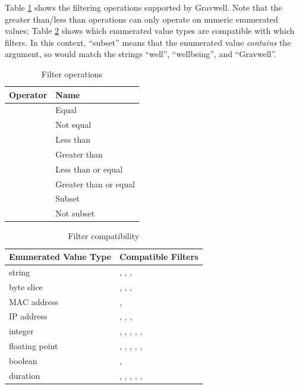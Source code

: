 Table \ref{table:filter-ops} shows the filtering operations supported by Gravwell. Note that the greater than/less than operations can only operate on numeric enumerated values; Table \ref{table:filter-compatibility} shows which enumerated value types are compatible with which filters. In this context, ``subset'' means that the enumerated value \emph{contains} the argument, so  would match the strings ``well'', ``wellbeing'', and ``Gravwell''.

\begin{table}[H]
\begin{tabular}{ll}
\textbf{Operator} & \textbf{Name} \\
\hline
\code{==} &	Equal \\
\code{!=} &	Not equal  \\
\code{<} &	Less than  \\
\code{>} &	Greater than \\
\code{<=} &	Less than or equal \\
\code{>=} &	Greater than or equal \\
\code{\textasciitilde} &	Subset \\
\code{!\textasciitilde} &	Not subset \\
\end{tabular}
\caption{Filter operations}
\label{table:filter-ops}
\end{table}

\begin{table}[H]
\begin{tabular}{ll}
\textbf{Enumerated Value Type} & \textbf{Compatible Filters} \\
\hline
string & \code{==}, \code{!=}, \code{\textasciitilde}, \code{!\textasciitilde} \\
byte slice & \code{==}, \code{!=}, \code{\textasciitilde}, \code{!\textasciitilde} \\
MAC address & \code{==}, \code{!=} \\
IP address & \code{==}, \code{!=}, \code{\textasciitilde}, \code{!\textasciitilde} \\
integer & \code{==}, \code{!=}, \code{<}, \code{>}, \code{<=}, \code{>=} \\
floating point & \code{==}, \code{!=}, \code{<}, \code{>}, \code{<=}, \code{>=} \\
boolean & \code{==}, \code{!=} \\
duration & \code{==}, \code{!=}, \code{<}, \code{>}, \code{<=}, \code{>=} \\
\end{tabular}
\caption{Filter compatibility}
\label{table:filter-compatibility}
\end{table}


